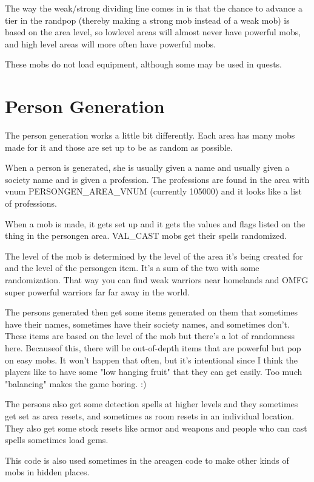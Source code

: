 The way the weak/strong dividing line comes in is that the chance
to advance a tier in the randpop (thereby making a strong mob
instead of a weak mob) is based on the area level, so lowlevel
areas will almost never have powerful mobs, and high level areas
will more often have powerful mobs.

These mobs do not load equipment, although some may be used in quests.


\section{Person Generation}


The person generation works a little bit differently. Each area has
many mobs made for it and those are set up to be as random as possible.

When a person is generated, she is usually given a name and usually
given a society name and is given a profession. The professions are
found in the area with vnum PERSONGEN\_AREA\_VNUM (currently 105000)
and it looks like a list of professions. 

When a mob is made, it gets set up and it gets the values and 
flags listed on the thing in the persongen area. VAL\_CAST mobs get 
their spells randomized.

The level of the mob is determined by the level of the area it's
being created for and the level of the persongen item. It's a sum of
the two with some randomization. That way you can find weak warriors
near homelands and OMFG super powerful warriors far far away in the
world. 

The persons generated then get some items generated on them that
sometimes have their names, sometimes have their society names,
and sometimes don't. These items are based on the level of the mob
but there's a lot of randomness here. Becauseof this, there will
be out-of-depth items that are powerful but pop on easy mobs.
It won't happen that often, but it's intentional since I think the
players like to have some "low hanging fruit" that they can get
easily. Too much "balancing" makes the game boring. :)


The persons also get some detection spells at higher levels and they
sometimes get set as area resets, and sometimes as room resets in
an individual location. They also get some stock resets like 
armor and weapons and people who can cast spells sometimes load
gems.

This code is also used sometimes in the areagen code to make other kinds
of mobs in hidden places.





